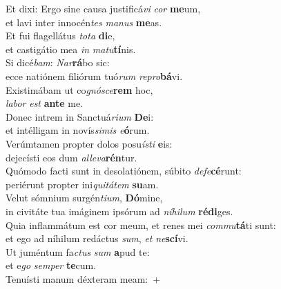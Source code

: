 \oddverse Et dixi: Ergo sine causa justificá\textit{vi} \textit{cor} \textbf{me}um,~\*\\
\oddverse et lavi inter innocén\textit{tes} \textit{ma}\textit{nus} \textbf{me}as.\\
\evenverse Et fui flagellátus \textit{to}\textit{ta} \textbf{di}e,~\*\\
\evenverse et castigátio mea \textit{in} \textit{ma}\textit{tu}\textbf{tí}nis.\\
\oddverse Si dicé\textit{bam}: \textit{Nar}\textbf{rá}bo sic:~\*\\
\oddverse ecce natiónem filiórum tuó\textit{rum} \textit{re}\textit{pro}\textbf{bá}vi.\\
\evenverse Existimábam ut co\textit{gnó}\textit{sce}\textbf{rem} hoc,~\*\\
\evenverse \textit{la}\textit{bor} \textit{est} \textbf{an}\textbf{te} me.\\
\oddverse Donec intrem in Sanctuá\textit{ri}\textit{um} \textbf{De}i:~\*\\
\oddverse et intélligam in novís\textit{si}\textit{mis} \textit{e}\textbf{ó}rum.\\
\evenverse Verúmtamen propter dolos posu\textit{í}\textit{sti} \textbf{e}is:~\*\\
\evenverse dejecísti eos dum \textit{al}\textit{le}\textit{va}\textbf{rén}tur.\\
\oddverse Quómodo facti sunt in desolatiónem, súbito \textit{de}\textit{fe}\textbf{cé}runt:~\*\\
\oddverse periérunt propter ini\textit{qui}\textit{tá}\textit{tem} \textbf{su}am.\\
\evenverse Velut sómnium surgén\textit{ti}\textit{um}, \textbf{Dó}mine,~\*\\
\evenverse in civitáte tua imáginem ipsórum ad \textit{ní}\textit{hi}\textit{lum} \textbf{ré}\textbf{di}ges.\\
\oddverse Quia inflammátum est cor meum, et renes mei \textit{com}\textit{mu}\textbf{tá}ti sunt:~\*\\
\oddverse et ego ad níhilum redáctus \textit{sum}, \textit{et} \textit{ne}\textbf{scí}vi.\\
\evenverse Ut juméntum fa\textit{ctus} \textit{sum} \textbf{a}pud te:~\*\\
\evenverse et e\textit{go} \textit{sem}\textit{per} \textbf{te}cum.\\
\oddverse Tenuísti manum déxteram meam:~+\\
